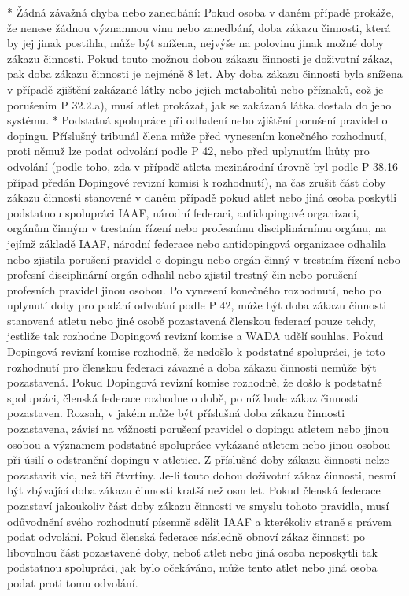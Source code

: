   * Žádná závažná chyba nebo zanedbání: Pokud osoba v daném případě  prokáže, že nenese žádnou významnou vinu nebo zanedbání, doba zákazu činnosti, která by jej jinak postihla, může být snížena, nejvýše na polovinu jinak možné doby zákazu činnosti. Pokud touto možnou dobou zákazu činnosti je doživotní zákaz, pak doba zákazu činnosti je nejméně 8 let. Aby doba zákazu činnosti byla snížena v případě zjištění zakázané látky nebo jejich metabolitů  nebo příznaků, což je porušením P 32.2.a), musí atlet prokázat, jak se zakázaná látka dostala do jeho systému.
  * Podstatná spolupráce při odhalení nebo zjištění porušení pravidel o dopingu. Příslušný tribunál člena může před vynesením konečného rozhodnutí, proti němuž lze podat odvolání podle P 42, nebo před uplynutím lhůty pro odvolání (podle toho, zda v případě atleta mezinárodní úrovně byl podle P 38.16 případ předán Dopingové revizní komisi k rozhodnutí), na čas zrušit část doby zákazu činnosti stanovené v daném případě pokud atlet nebo jiná osoba poskytli podstatnou spolupráci IAAF, národní federaci, antidopingové organizaci, orgánům činným v trestním řízení nebo profesnímu disciplinárnímu orgánu, na jejímž základě IAAF, národní federace nebo antidopingová organizace odhalila nebo zjistila porušení pravidel o dopingu nebo orgán činný v trestním řízení nebo profesní disciplinární orgán odhalil nebo zjistil trestný čin nebo porušení profesních pravidel jinou osobou. Po vynesení konečného rozhodnutí, nebo po uplynutí doby pro podání odvolání podle P 42, může být doba zákazu činnosti stanovená atletu nebo jiné osobě pozastavená členskou federací pouze tehdy, jestliže tak rozhodne Dopingová revizní komise a WADA udělí souhlas. Pokud Dopingová revizní komise rozhodně, že nedošlo k podstatné spolupráci, je toto rozhodnutí pro členskou federaci závazné a doba zákazu činnosti nemůže být pozastavená. Pokud Dopingová revizní komise rozhodně, že došlo k podstatné spolupráci, členská federace rozhodne o době, po níž bude zákaz činnosti pozastaven. Rozsah, v jakém může být příslušná doba zákazu činnosti pozastavena, závisí na vážnosti porušení pravidel o dopingu atletem nebo jinou osobou a významem podstatné spolupráce vykázané atletem nebo jinou osobou při úsilí o odstranění dopingu v atletice. Z příslušné doby zákazu činnosti nelze pozastavit víc, než tři čtvrtiny. Je-li touto dobou doživotní zákaz činnosti, nesmí být zbývající doba zákazu činnosti kratší než osm let.  Pokud členská federace pozastaví jakoukoliv část doby zákazu činnosti ve smyslu tohoto pravidla, musí odůvodnění svého rozhodnutí písemně sdělit IAAF a kterékoliv straně s právem podat odvolání. Pokud členská federace následně obnoví zákaz činnosti po libovolnou část pozastavené doby, neboť atlet nebo jiná osoba neposkytli tak podstatnou spolupráci, jak bylo očekáváno, může tento atlet nebo jiná osoba podat proti tomu odvolání.
